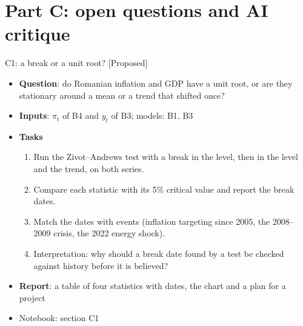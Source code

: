 \section{Part C: open questions and AI critique}

\begin{frame}{C1: a break or a unit root? [Proposed]}
\itemsize{\footnotesize}
\begin{itemize}
\item \textbf{Question}: do Romanian inflation and GDP have a unit root, or are they stationary around a mean or a trend that shifted once?
\item \textbf{Inputs}: $\pi_t$ of B4 and $y_t$ of B3; models: B1, B3
\item \textbf{Tasks}
\begin{enumerate}
    \item Run the Zivot--Andrews test with a break in the level, then in the level and the trend, on both series.
    \item Compare each statistic with its 5\% critical value and report the break dates.
    \item Match the dates with events (inflation targeting since 2005, the 2008--2009 crisis, the 2022 energy shock).
    \item Interpretation: why should a break date found by a test be checked against history before it is believed?
\end{enumerate}
\item \textbf{Report}: a table of four statistics with dates, the chart and a plan for a project
\item Notebook: section C1
\end{itemize}
\end{frame}

